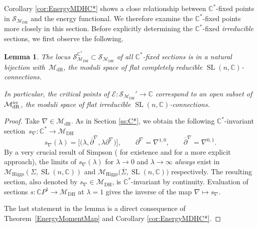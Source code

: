 \documentclass[pdftex]{sigma}
\numberwithin{equation}{section}
\newtheorem{Lemma}[Theorem]{Lemma}
\theoremstyle{definition}
\newcommand\C{{\mathbb C}}
\begin{document}
Corollary \ref{cor:EnergyMDHC*} shows a close relationship between $\C^*$-fixed points in $\mathcal
S_{\mathcal{M}_{\mathrm{DH}}}$ and the energy functional. We therefore examine the $\C^*$-fixed points more closely in this
section. Before explicitly determining the $\C^*$-fixed \emph{irreducible} sections, we first
observe the following.

\begin{Lemma}\label{lem:C*fixedMdh}
The locus $\mathcal{S}_{\mathcal{M}_{\mathrm{DH}}}^{\C^*} \subset \mathcal{S}_{\mathcal{M}_{\mathrm{DH}}}$ of all $\C^*$-fixed sections is in a
natural bijection with~$\mathcal{M}_{\mathrm{dR}}$, the moduli space of flat completely reducible $\operatorname{SL}(n,\C)$-connections.

In particular, the critical points of $\mathcal{E} \colon \mathcal{S}_{\mathcal{M}_{\mathrm{DH}}}'
\longrightarrow \C$ correspond to an open subset of $\mathcal{M}_{\mathrm{dR}}^{\rm irr}$, the moduli space of flat irreducible $\operatorname{SL}(n,\C)$-connections.
\end{Lemma}

\begin{proof}
Take $\nabla \in \mathcal{M}_{\mathrm{dR}}$.
As in Section \ref{ss:C*}, we obtain the following $\C^*$-invariant section~$s_\nabla \colon \allowbreak\C^*
\longrightarrow \mathcal{M}_{\mathrm{DH}}$
\begin{equation}\label{eq:sNablaOverC*}
 s_\nabla(\lambda) = \big[\bigl(\lambda, {\overline{\partial}}^\nabla, \lambda \partial^\nabla\bigr) \big],\qquad
\partial^\nabla = \nabla^{1,0}, \qquad {\overline{\partial}}^\nabla = \nabla^{0,1}.
\end{equation}
By a very crucial result of Simpson (\cite{Si-Hodge} for existence and \cite{Simpson-iterated}
for a more explicit approach), the limits of $s_\nabla(\lambda)$ for
$\lambda \to 0$ and $\lambda\to \infty$
\emph{always} exist in $\mathcal{M}_{\mathrm{Higgs}}(\Sigma, \operatorname{SL}(n,\C))$ and $\mathcal{M}_{\mathrm{Higgs}}\bigl(\overline{\Sigma}, \operatorname{SL}(n,\C)\bigr)$ respectively.
The resulting section, also denoted by $s_{\nabla} \in \mathcal{M}_{\mathrm{DH}}$, is $\C^*$-invariant by continuity.
Evaluation of sections $s \colon \C P^1 \longrightarrow \mathcal{M}_{\mathrm{DH}}$ at $\lambda = 1$
gives the inverse of the map $\nabla \longmapsto s_\nabla$.

The last statement in the lemma is a direct consequence of Theorem~\ref{EnergyMomentMap} and
Corollary \ref{cor:EnergyMDHC*}.
\end{proof}
\end{document}
